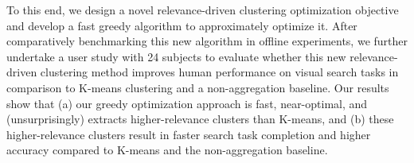 To this end, we design a novel relevance-driven clustering optimization objective and develop a fast greedy algorithm to approximately optimize it.  After comparatively benchmarking this new algorithm in offline experiments, we further undertake a user study with 24 subjects to evaluate whether this new relevance-driven clustering method improves human performance on visual search tasks in comparison to K-means clustering and a non-aggregation baseline.  Our results show that (a) our greedy optimization approach is fast, near-optimal, and (unsurprisingly) extracts higher-relevance clusters than K-means, and (b) these higher-relevance clusters result in faster search task completion and higher accuracy compared to K-means and the non-aggregation baseline.


